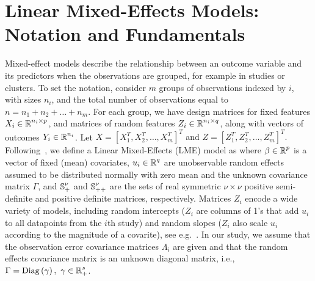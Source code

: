 \section{Linear Mixed-Effects Models: Notation and Fundamentals}
Mixed-effect models describe the relationship between an outcome variable and its predictors when the observations are grouped, for example in studies or clusters.  To set the notation, consider $m$ groups of observations indexed by $i$, with sizes $n_i$, and the total number of observations equal to $n = n_1 + n_2 + \dots + n_m$. For each group, we have design matrices for fixed features $X_i \in \operatorname{\mathbb{R}}^{n_i \times p}$,  and matrices of random features $Z_i \in \operatorname{\mathbb{R}}^{n_i \times q}$, along with vectors of outcomes $Y_i \in \operatorname{\mathbb{R}}^{n_i}$. 
Let 
{$X = [X_1^T, X_2^T, \dots, X_m^T]^T$ and $Z = [Z_1^T, Z_2^T, \dots, Z_m^T]^T$.} 
Following~\cite{Patterson1971, Pinheiro2000}, we define a Linear Mixed-Effects (LME) model as
 where $\beta \in \operatorname{\mathbb{R}}^p$ is a vector of fixed (mean) covariates, 
 $u_i \in \operatorname{\mathbb{R}}^{q}$ are unobservable random effects assumed to be distributed normally with zero mean and the unknown covariance matrix $\Gamma$, and $\operatorname{\mathbb{S}}_{+}^{\nu}$ 
 and $\operatorname{\mathbb{S}}_{++}^{\nu}$ are the sets of
 real symmetric $\nu\times \nu$ positive semi-definite
 and positive definite matrices, respectively. 
Matrices $Z_i$ encode a wide variety of models, including
random intercepts ($Z_i$ are columns of 1's that add $u_i$ to all datapoints from the $i$th study)
and random slopes ($Z_i$ also scale $u_i$ according to the magnitude of a covarite), see e.g.~\cite{pinheiro2006mixed}. 
In our study, we assume that the observation error covariance matrices 
$\Lambda_i$ are given and that the random effects covariance matrix 
is an unknown diagonal matrix, i.e., $\Gamma = \mathrm{Diag}\left(\gamma\right), \ \gamma \in \operatorname{\mathbb{R}}^s_+$.
 
